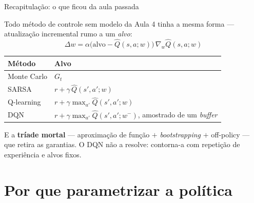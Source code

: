 \documentclass[aspectratio=169, 11pt]{beamer}
\newcommand{\wv}{w}                             %
\newcommand{\Qhat}{\hat{Q}}
\begin{document}
\begin{frame}{Recapitulação: o que ficou da aula passada}

  Todo método de controle sem modelo da Aula 4 tinha a mesma forma ---
  atualização incremental rumo a um \emph{alvo}:
  \[
    \Delta \wv = \alpha\bigl(\text{alvo} - \Qhat(s,a;\wv)\bigr)\, \nabla_{\wv} \Qhat(s,a;\wv)
  \]

  \begin{center}\small
  \begin{tabular}{@{}ll@{}}
    \toprule
    \textbf{Método} & \textbf{Alvo} \\
    \midrule
    Monte Carlo   & $G_t$ \\
    SARSA         & $r + \gamma\,\Qhat(s',a';\wv)$ \\
    Q-learning    & $r + \gamma \max_{a'} \Qhat(s',a';\wv)$ \\
    DQN           & $r + \gamma \max_{a'} \Qhat(s',a';\wv^{-})$, amostrado de um \emph{buffer} \\
    \bottomrule
  \end{tabular}
  \end{center}

  \begin{alertabox}
    E a \textbf{tríade mortal} --- aproximação de função $+$
    \emph{bootstrapping} $+$ off-policy --- que retira as garantias. O DQN não
    a resolve: contorna-a com repetição de experiência e alvos fixos.
  \end{alertabox}
\end{frame}

\section{Por que parametrizar a política}
\end{document}
